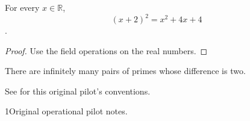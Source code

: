 \documentclass{article}
\begin{document}
\begin{theorem}\label{real-domain-identity}
For every $x\in\mathbb{R}$, \[(x+2)^2=x^2+4x+4\].
\end{theorem}
\begin{proof}Use the field operations on the real numbers.\end{proof}
\begin{conjecture}\label{unsupported-primes}
There are infinitely many pairs of primes whose difference is two.
\end{conjecture}
See \cite{original-notes} for this original pilot's conventions.
\begin{thebibliography}{1}Original operational pilot notes.\end{thebibliography}
\end{document}
